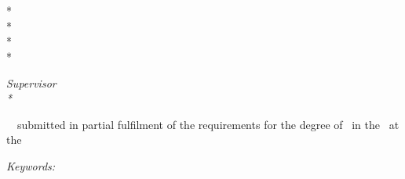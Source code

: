 \begin{titlepage}
    \centering
    \vspace*{1cm}

    \begin{Huge}
        \bfseries\titl\par
        \vskip 0.2cm
    \end{Huge}

    \vskip 2cm


    \logo

    \vskip 2cm

    \begin{Large}
        \bfseries\auth\\
    \end{Large}

    \begin{normalsize}
        \vskip 2mm
        \dept\\*
        \uni\\*
        \city\\*
        \country\\*

        \vskip 1cm
    \end{normalsize}

    \begin{normalsize}
        {\itshape Supervisor \\*}
        \supervisor\\
        \vskip 0.2cm
    \end{normalsize}


    \begin{Large}
        {\bfseries \MonthYear}
        \vskip 0.5cm
    \end{Large}

    \degreeabv\ \documenttype\ submitted in partial fulfilment of the requirements for the degree of \degreee\ in the \dept\ at the \uni

    \vskip 0.5cm

    \begin{normalsize}
        {\itshape Keywords:}
        \key
    \end{normalsize}

    \vskip 1cm

    \bottomlogos
\end{titlepage}
